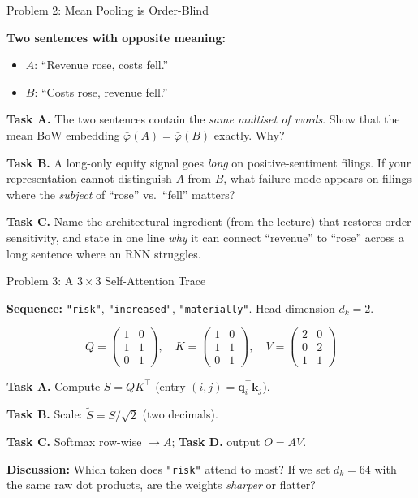 \documentclass[9pt,t]{beamer}
\begin{document}
\begin{frame}{Problem 2: Mean Pooling is Order-Blind}

\textbf{Two sentences with opposite meaning:}
\begin{itemize}
  \item $A$: ``Revenue rose, costs fell.''
  \item $B$: ``Costs rose, revenue fell.''
\end{itemize}

\medskip
\textbf{Task A.} The two sentences contain the \emph{same multiset of words}.
Show that the mean BoW embedding $\bar\varphi(A)=\bar\varphi(B)$ exactly. Why?

\medskip
\textbf{Task B.} A long-only equity signal goes \emph{long} on positive-sentiment
filings. If your representation cannot distinguish $A$ from $B$, what failure mode
appears on filings where the \emph{subject} of ``rose'' vs.\ ``fell'' matters?

\medskip
\textbf{Task C.} Name the architectural ingredient (from the lecture) that
restores order sensitivity, and state in one line \emph{why} it can connect
``revenue'' to ``rose'' across a long sentence where an RNN struggles.
\end{frame}

\begin{frame}{Problem 3: A $3\times3$ Self-Attention Trace}

\textbf{Sequence:} \texttt{"risk"}, \texttt{"increased"}, \texttt{"materially"}.
\quad Head dimension $d_k = 2$.

\medskip
\[
Q = \begin{pmatrix} 1 & 0 \\ 1 & 1 \\ 0 & 1 \end{pmatrix},\quad
K = \begin{pmatrix} 1 & 0 \\ 1 & 1 \\ 0 & 1 \end{pmatrix},\quad
V = \begin{pmatrix} 2 & 0 \\ 0 & 2 \\ 1 & 1 \end{pmatrix}
\]

\medskip
\textbf{Task A.} Compute $S = QK^\top$ (entry $(i,j)=\mathbf{q}_i^\top\mathbf{k}_j$).

\textbf{Task B.} Scale: $\tilde S = S/\sqrt{2}$ (two decimals).

\textbf{Task C.} Softmax row-wise $\to A$; \quad
\textbf{Task D.} output $O = AV$.

\medskip
\textbf{Discussion:} Which token does \texttt{"risk"} attend to most? If we set
$d_k=64$ with the same raw dot products, are the weights \emph{sharper} or flatter?
\end{frame}
\end{document}
